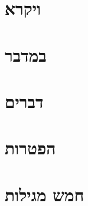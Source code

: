 \documentclass[twoside, openany, parskip=half, 11pt]{book}
\begin{document}
	
	\chapter[ויקרא]{ ויקרא }


	\chapter[במדבר]{ במדבר }


	\chapter[דברים]{ דברים }


	\chapter[הפטרות]{ הפטרות }
	
	\section[]{}

	\chapter[חמש מגילות]{ חמש מגילות }
	
	\section[]{}
\end{document}
